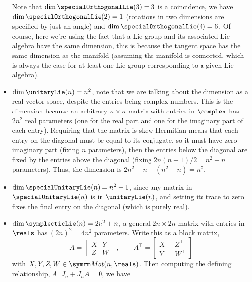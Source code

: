 \documentclass[fleqn]{NotesClass}
\newcommand{\trans}{{\top}}
\begin{document}
\begin{itemize}
        Note that \(\dim \specialOrthogonalLie(3) = 3\) is a coincidence, we have \(\dim \specialOrthogonalLie(2) = 1\) (rotations in two dimensions are specified by just an angle) and \(\dim \specialOrthogonalLie(4) = 6\).
        Of course, here we're using the fact that a Lie group and its associated Lie algebra have the same dimension, this is because the tangent space has the same dimension as the manifold (assuming the manifold is connected, which is always the case for at least one Lie group corresponding to a given Lie algebra).
        \item \(\dim \unitaryLie(n) = n^2\), note that we are talking about the dimension as a real vector space, despite the entries being complex numbers.
        This is the dimension because an arbitrary \(n \times n\) matrix with entries in \(\complex\) has \(2n^2\) real parameters (one for the real part and one for the imaginary part of each entry).
        Requiring that the matrix is skew-Hermitian means that each entry on the diagonal must be equal to its conjugate, so it must have zero imaginary part (fixing \(n\) parameters), then the entries below the diagonal are fixed by the entries above the diagonal (fixing \(2 n(n - 1)/2 = n^2 - n\) parameters).
        Thus, the dimension is \(2n^2 - n - (n^2 - n) = n^2\).
        \item \(\dim \specialUnitaryLie(n) = n^2 - 1\), since any matrix in \(\specialUnitaryLie(n)\) is in \(\unitaryLie(n)\), and setting its trace to zero fixes the final entry on the diagonal (which is purely real).
        \item \(\dim \symplecticLie(n) = 2n^2 + n\), a general \(2n \times 2n\) matrix with entries in \(\reals\) has \((2n)^2 = 4n^2\) parameters.
        Write this as a block matrix,
        \begin{equation}
            A = 
            \begin{bmatrix}
                X & Y\\
                Z & W
            \end{bmatrix}
            , \qquad A^{\trans} = 
            \begin{bmatrix}
                X^{\trans} & Z^{\trans}\\
                Y^{\trans} & W^{\trans}
            \end{bmatrix}
        \end{equation}
        with \(X, Y, Z, W \in \matrices{n}{\reals}\).
        Then computing the defining relationship, \(A^{\trans}J_n + J_nA = 0\), we have

\end{itemize}
\end{document}
